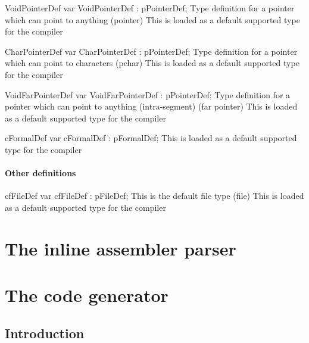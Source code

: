 \documentclass [a4paper,12pt]{article}
\begin{document}
\begin{variable}{VoidPointerDef}
\Declaration
var VoidPointerDef : pPointerDef;
\Description
Type definition for a pointer which can point to anything (\textsf{pointer})
\Notes
This is loaded as a default supported type for the compiler
\end{variable}

\begin{variable}{CharPointerDef}
\Declaration
var CharPointerDef : pPointerDef;
\Description
Type definition for a pointer which can point to characters (\textsf{pchar})
\Notes
This is loaded as a default supported type for the compiler
\end{variable}

\begin{variable}{VoidFarPointerDef}
\Declaration
var VoidFarPointerDef : pPointerDef;
\Description
Type definition for a pointer which can point to anything
(intra-segment) (\textsf{far pointer})
\Notes
This is loaded as a default supported type for the compiler
\end{variable}

\begin{variable}{cFormalDef}
\Declaration
var cFormalDef : pFormalDef;
\Notes
This is loaded as a default supported type for the compiler
\end{variable}

\paragraph{Other definitions}

\begin{variable}{cfFileDef}
\Declaration
var cfFileDef : pFileDef;
\Description This is the default file type (\textsf{file})
\Notes This is loaded as a default supported type for the compiler
\end{variable}

\section{The inline assembler parser}
\label{sec:mylabel6}

\section{The code generator}
\label{sec:mylabel7}

\subsection{Introduction}
\label{subsec:introductioneratorer}
\end{document}

